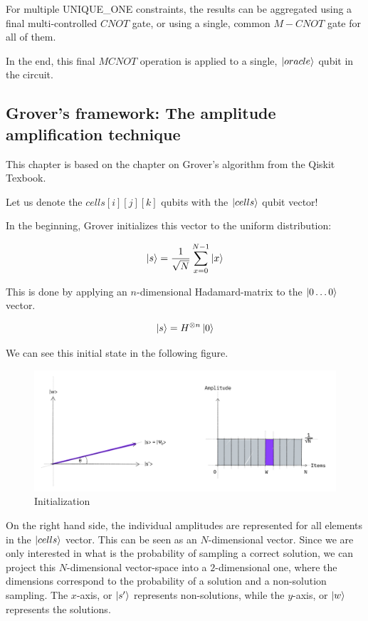 For multiple UNIQUE\_ONE constraints, the results can be aggregated using a final multi-controlled $CNOT$ gate, or using a single, common $M-CNOT$ gate for all of them.

In the end, this final $MCNOT$ operation is applied to a single, $\ket{oracle}$ qubit in the circuit.

\subsection{Grover's framework: The amplitude amplification technique}

This chapter is based on the chapter on Grover's algorithm from the Qiskit Texbook\cite{GroverQiskitTextbook}.

Let us denote the $cells[i][j][k]$ qubits with the $\ket{cells}$ qubit vector!

In the beginning, Grover initializes this vector to the uniform distribution:

\begin{align*}
\ket{s} = \frac{1}{\sqrt{N}}\sum\limits_{x=0}^{N-1}\ket{x}
\end{align*}

This is done by applying an $n$-dimensional Hadamard-matrix to the $\ket{0\dots{}0}$ vector.

\begin{align*}
\ket{s} = H^{\otimes{}n}\ket{0}
\end{align*}

We can see this initial state in the following figure.

\begin{figure}[H]
  \centering
    \includegraphics[width=\linewidth]{content/assets/03_grovers_algorithm/grover_step1.jpg}
    \caption{Initialization}
\end{figure}

On the right hand side, the individual amplitudes are represented for all elements in the $\ket{cells}$ vector. This can be seen as an $N$-dimensional vector. Since we are only interested in what is the probability of sampling a correct solution, we can project this $N$-dimensional vector-space into a $2$-dimensional one, where the dimensions correspond to the probability of a solution and a non-solution sampling. The $x$-axis, or $\ket{s'}$ represents non-solutions, while the $y$-axis, or $\ket{w}$ represents the solutions.

